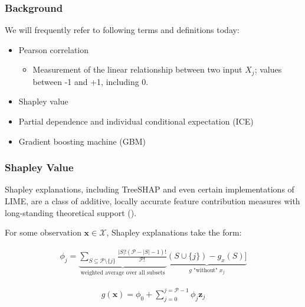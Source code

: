 \documentclass[11pt,aspectratio=169,hyperref={colorlinks}]{beamer}
\begin{document}
\begin{frame}[allowframebreaks]
		\end{frame}


		\begin{frame}
		
			\frametitle{Background}		
			
			We will frequently refer to following terms and definitions today: \\			
			
			\begin{itemize}
				\item{Pearson correlation}
					\begin{itemize}
						\item{Measurement of the linear relationship between two input $X_j$; values between -1 and +1, including 0.}
					\end{itemize}
				\item{Shapley value}
				\item{Partial dependence and individual conditional expectation (ICE)}
				\item{Gradient boosting machine (GBM)}
			\end{itemize}			
		
		\end{frame}
		
		\begin{frame}
		
			\frametitle{Shapley Value}	
			
			Shapley explanations, including TreeSHAP and even certain implementations of LIME, are a class of additive, locally accurate feature contribution measures with long-standing theoretical support (\cite{shapley}). 

			\vspace{8pt}
			
			For some observation $\mathbf{x} \in \mathcal{X}$, Shapley explanations take the form:
			
			\begin{equation}
				\label{eq:shap_contrib}
				\begin{aligned}
					\phi_{j} = \underbrace{\sum_{S \subseteq \mathcal{P} \setminus \{j\}}\frac{|S|!(\mathcal{P} -|S| -1)!}{\mathcal{P}!}}_\text{weighted average over all subsets}\underbrace{(S \cup \{j\}) - g_x(S)]}_{g\text{ "without" }x_j}
				\end{aligned}
			\end{equation}
			
			\begin{equation}
				\label{eq:shap_additive}
				\begin{aligned}
					g(\mathbf{x}) = \phi_0 + \sum_{j=0}^{j=\mathcal{P} - 1} \phi_j \mathbf{z}_j
				\end{aligned}
			\end{equation}
			
		\end{frame}
		
\end{document}
